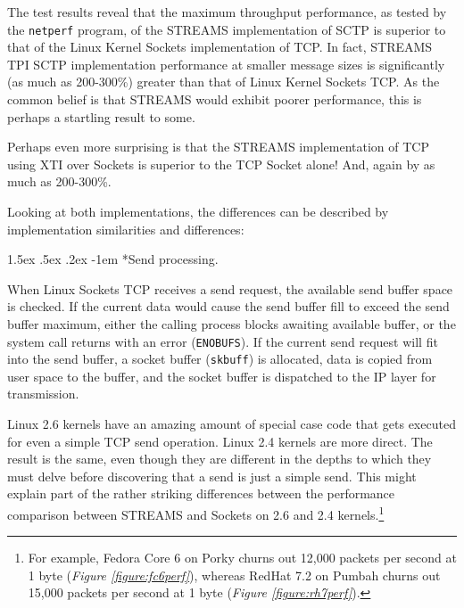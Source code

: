 \documentclass[letterpaper,final,notitlepage,twocolumn,10pt,twoside]{article}
\makeatletter
\renewcommand\paragraph{\@startsection{paragraph}{4}{\z@}%
                                    {1.5ex \@plus .5ex \@minus .2ex}%
                                    {-1em}%
                                    {\normalfont\normalsize\bfseries\slshape}}
\makeatother
\begin{document}
The test results reveal that the maximum throughput performance, as tested by the \texttt{netperf}
program, of the STREAMS implementation of SCTP is superior to that of the Linux Kernel Sockets
implementation of TCP.  In fact, STREAMS TPI SCTP implementation performance at smaller message
sizes is significantly (as much as 200-300\%) greater than that of Linux Kernel Sockets TCP.  As the
common belief is that STREAMS would exhibit poorer performance, this is perhaps a startling result
to some.

Perhaps even more surprising is that the STREAMS implementation of TCP using XTI over Sockets is
superior to the TCP Socket alone!  And, again by as much as 200-300\%.

Looking at both implementations, the differences can be described by implementation similarities and
differences:

\paragraph*{Send processing.}

When Linux Sockets TCP receives a send request, the available send buffer space is checked.  If the
current data would cause the send buffer fill to exceed the send buffer maximum, either the calling
process blocks awaiting available buffer, or the system call returns with an error
(\texttt{ENOBUFS}).  If the current send request will fit into the send buffer, a socket buffer
(\texttt{skbuff}) is allocated, data is copied from user space to the buffer, and the socket buffer
is dispatched to the IP layer for transmission.

Linux 2.6 kernels have an amazing amount of special case code that gets executed for even a simple
TCP send operation.  Linux 2.4 kernels are more direct.  The result is the same, even though they
are different in the depths to which they must delve before discovering that a send is just a simple
send.  This might explain part of the rather striking differences between the performance comparison
between STREAMS and Sockets on 2.6 and 2.4 kernels.\footnote{For example, Fedora Core 6 on Porky
churns out 12,000 packets per second at 1 byte (\textsl{Figure \ref{figure:fc6perf}}), whereas
RedHat 7.2 on Pumbah churns out 15,000 packets per second at 1 byte (\textsl{Figure
\ref{figure:rh7perf}}).}
\end{document}
